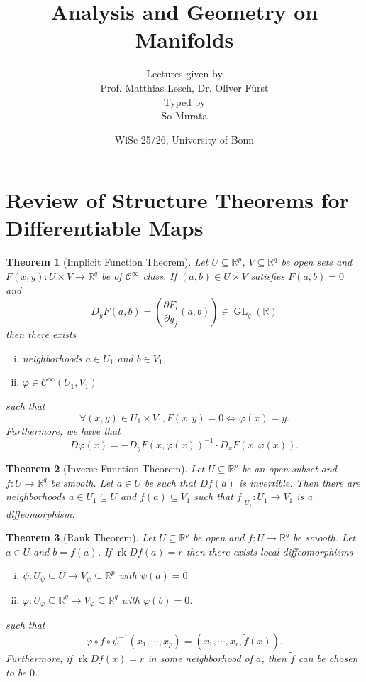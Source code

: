 \documentclass[8pt]{article}
\title{Analysis and Geometry on Manifolds}
\author{Lectures given by\\Prof. Matthias Lesch, Dr. Oliver Fürst\\Typed by\\So Murata}
\date{WiSe 25/26, University of Bonn}
\newtheorem{theorem}{Theorem} [section]
\DeclareMathOperator{\GL}{GL}
\DeclareMathOperator{\rk}{rk}
\newcommand{\R}[0]{\mathbb{R}}
\begin{document}
\maketitle
\section{Review of Structure Theorems for Differentiable Maps}

\begin{theorem}[Implicit Function Theorem]
Let $U\subseteq\R^p$, $V\subseteq\R^q$ be open sets and $F(x,y):U\times V\to \R^{q}$ be of $\mathcal{C}^\infty$ class. If $(a,b)\in U\times V$ satisfies $F(a,b)=0$ and 
\begin{equation*}
D_yF(a,b) = \left({\frac {\partial F_i} {\partial y_j}}(a,b)\right)\in\GL_q(\R)
\end{equation*}
 then there exists 
\begin{enumerate}[i).]
\item neighborhoods $a\in U_1$ and $b\in V_1$,
\item $\varphi\in\mathcal{C}^\infty(U_1,V_1)$
\end{enumerate}
such that 
\begin{equation*}
\forall (x,y)\in U_1\times V_1, F(x,y) = 0\Leftrightarrow \varphi(x)=y.
\end{equation*}
Furthermore, we have that
\begin{equation*}
D\varphi(x) = -D_yF(x,\varphi(x))^{-1}\cdot D_xF(x,\varphi(x)).
\end{equation*}
\end{theorem}

\begin{theorem}[Inverse Function Theorem]
Let $U\subseteq\R^p$ be an open subset and $f:U\to\R^q$ be smooth. Let $a\in U$ be such that $Df(a)$ is invertible. Then there are neighborhoods $a\in U_1\subseteq U$ and $f(a)\subseteq V_1$ such that $f|_{U_1}:U_1\to V_1$ is a diffeomorphism.
\end{theorem}

\begin{theorem}[Rank Theorem]
Let $U\subseteq\R^p$ be open and $f:U\to\R^q$ be smooth. Let $a\in U$ and $b=f(a)$. If $\rk Df(a)=r$ then there exists local diffeomorphisms
\begin{enumerate}[i).]
\item $\psi:U_\psi\subseteq U\to V_\psi\subseteq\R^p$ with $\psi(a)=0$ 
\item $\varphi:U_\varphi\subseteq \R^q\to V_\varphi\subseteq\R^q$ with $\varphi(b)=0$.
\end{enumerate}
such that 
\begin{equation*}
\varphi\circ f\circ \psi^{-1}(x_1,\cdots,x_p)= (x_1,\cdots,x_r,\tilde{f}(x)).
\end{equation*}
Furthermore, if $\rk Df(x)=r$ in some neighborhood of $a$, then $\tilde{f}$ can be chosen to be $0$.
\end{theorem}
\end{document}
